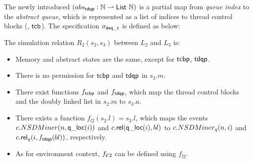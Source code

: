 The newly introduced $(abs_\comm{tdqp}: \integer \partf 
\comm{List\ \integer})$ is a partial map from \emph{queue index}
to the \emph{abstract queue}, which is represented as
a list of indices to thread control blocks (\ie, $\comm{tcb}$).
The specification $\spec_{\deq\comm{\_t}}$ is defined as below:
\begin{small}
\begin{mathpar}
\end{mathpar}
\end{small}%
The  simulation relation 
$R_{2} (s_2, s_3)$ between $L_2$ and $L_3$
is:
\vspace{-5pt}
\begin{itemize}
\itemsep0em
\item Memory and abstract states are the same, except for $\comm{tcbp}$,  $\comm{tdqp}$.
\item There is no permission for $\comm{tcbp}$
and $\comm{tdqp}$ in $s_3.m$.
\item There exist functions $f_\comm{tcbp}$
and $f_\comm{tdqp}$, which map the thread control blocks and the doubly linked list in $s_2.m$ to $s_3.a$.
\item There exists a function  $f_{l2}(s_2.l) = s_3.l$,
which maps the events $c.\acq(n,\qloc(i))$ and $c.\rel(\qloc(i), bl)$
to $c.\acq_q(n,i)$ and $c.\rel_q (i, f_\comm{tdqp}(bl))$,
respectively.
\item  As for environment context,  $f_{\oracle 2}$  can be defined using $f_{l2}$.
\end{itemize}

